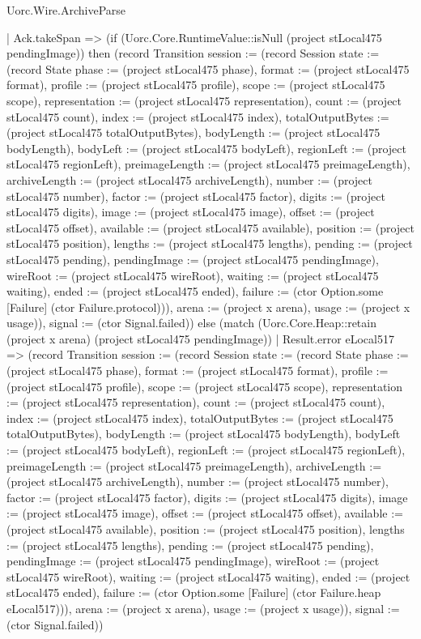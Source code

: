 \begin{lexlean}{Uorc.Wire.ArchiveParse}
\begin{semanticmodule}
{          | Ack.takeSpan => (if (Uorc.Core.RuntimeValue::isNull (project stLocal475 pendingImage)) then (record Transition {session := (record Session {state := (record State {phase := (project stLocal475 phase), format := (project stLocal475 format), profile := (project stLocal475 profile), scope := (project stLocal475 scope), representation := (project stLocal475 representation), count := (project stLocal475 count), index := (project stLocal475 index), totalOutputBytes := (project stLocal475 totalOutputBytes), bodyLength := (project stLocal475 bodyLength), bodyLeft := (project stLocal475 bodyLeft), regionLeft := (project stLocal475 regionLeft), preimageLength := (project stLocal475 preimageLength), archiveLength := (project stLocal475 archiveLength), number := (project stLocal475 number), factor := (project stLocal475 factor), digits := (project stLocal475 digits), image := (project stLocal475 image), offset := (project stLocal475 offset), available := (project stLocal475 available), position := (project stLocal475 position), lengths := (project stLocal475 lengths), pending := (project stLocal475 pending), pendingImage := (project stLocal475 pendingImage), wireRoot := (project stLocal475 wireRoot), waiting := (project stLocal475 waiting), ended := (project stLocal475 ended), failure := (ctor Option.some [Failure] (ctor Failure.protocol))}), arena := (project x arena), usage := (project x usage)}), signal := (ctor Signal.failed)}) else (match (Uorc.Core.Heap::retain (project x arena) (project stLocal475 pendingImage))
            | Result.error eLocal517 => (record Transition {session := (record Session {state := (record State {phase := (project stLocal475 phase), format := (project stLocal475 format), profile := (project stLocal475 profile), scope := (project stLocal475 scope), representation := (project stLocal475 representation), count := (project stLocal475 count), index := (project stLocal475 index), totalOutputBytes := (project stLocal475 totalOutputBytes), bodyLength := (project stLocal475 bodyLength), bodyLeft := (project stLocal475 bodyLeft), regionLeft := (project stLocal475 regionLeft), preimageLength := (project stLocal475 preimageLength), archiveLength := (project stLocal475 archiveLength), number := (project stLocal475 number), factor := (project stLocal475 factor), digits := (project stLocal475 digits), image := (project stLocal475 image), offset := (project stLocal475 offset), available := (project stLocal475 available), position := (project stLocal475 position), lengths := (project stLocal475 lengths), pending := (project stLocal475 pending), pendingImage := (project stLocal475 pendingImage), wireRoot := (project stLocal475 wireRoot), waiting := (project stLocal475 waiting), ended := (project stLocal475 ended), failure := (ctor Option.some [Failure] (ctor Failure.heap eLocal517))}), arena := (project x arena), usage := (project x usage)}), signal := (ctor Signal.failed)})
}
\end{semanticmodule}
\end{lexlean}
